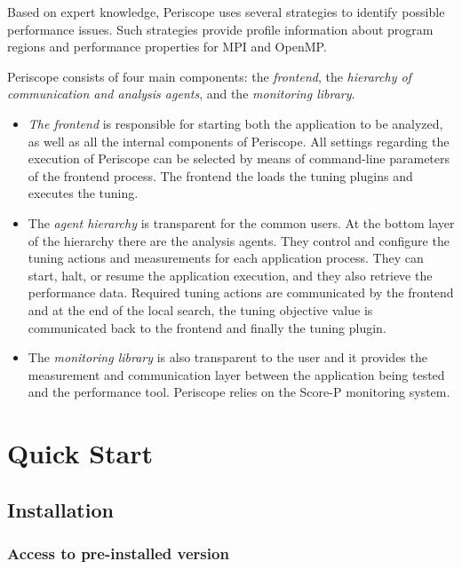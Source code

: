 \documentclass[11pt,oneside,a4paper]{book}
\begin{document}
Based on expert knowledge, Periscope uses several strategies to identify possible performance issues. Such strategies provide profile information about program regions and performance properties for MPI and OpenMP.

Periscope consists of four main components: the \textit{frontend}, the \textit{hierarchy of communication and analysis agents}, and the \textit{monitoring library}.

\begin{itemize}
\item \textit{The frontend} is responsible for starting both the application to be analyzed, as well as all the internal components of Periscope. All settings regarding the execution of Periscope can be selected by means of command-line parameters of the frontend process. The frontend the loads the tuning plugins and executes the tuning.

\item The \textit{agent hierarchy} is transparent for the common users. At the bottom layer of the hierarchy there are the analysis agents. They control and configure the tuning actions and measurements for each application process. They can start, halt, or resume the application execution, and they also retrieve the performance data. Required tuning actions are communicated by the frontend and at the end of the local search, the tuning objective value is communicated back to the frontend and finally the tuning plugin.

\item The \textit{monitoring library} is also transparent to the user and it provides the measurement and communication layer between the application being tested and the performance tool. Periscope relies on the Score-P monitoring system.

\end{itemize}


\chapter{Quick Start}


\section{Installation}

\subsection{Access to pre-installed version}
\end{document}
